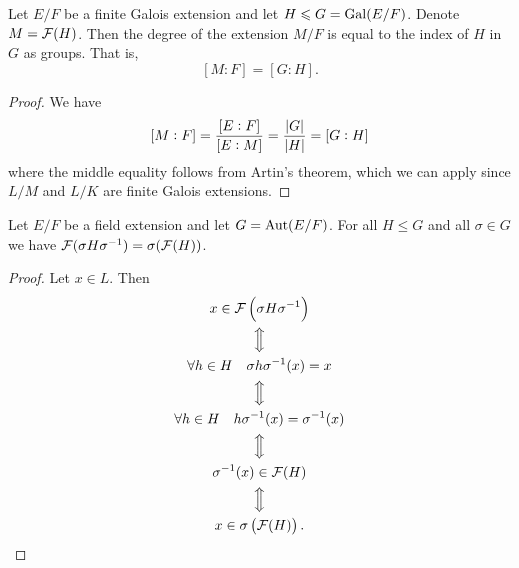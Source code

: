 \documentclass[11pt,a4paper]{article}
\begin{document}
\begin{corollary}
  Let $E/F$ be a finite Galois extension and
  let $H \leqslant G = \operatorname{Gal}(E/F)$.
  Denote $M = \mathcal F(H)$.
  Then the degree of the extension $M/F$ is equal to the index of $H$ in $G$
  as groups.
  That is,
  \[
    [M : F] = [G : H].
  \]
\end{corollary}
\begin{proof}
  We have
  \[
    [M : F] =
    \frac{[E : F]}{[E : M]} =
    \frac{\left\lvert G\right\rvert}{\left\lvert H\right\rvert} =
    [G : H]
  \]
  where the middle equality follows from Artin's theorem,
  which we can apply since $L/M$ and $L/K$
  are finite Galois extensions.
\end{proof}

\begin{lemma}
  \label{lem:lemma-for-galois-part-b}
  Let $E/F$ be a field extension and let $G = \operatorname{Aut}(E/F)$.
  For  all $H \leqslant G$ and all $\sigma \in G$ we have
  $\mathcal F(\sigma H \sigma^{-1}) = \sigma(\mathcal F(H))$.
\end{lemma}
\begin{proof}
  Let $x \in L$.
  Then
  \begin{gather*}
    x \in \FF\del{\sigma H \sigma^{-1}} \\
    \viff \\
    \forall h \in H \quad \sigma h \sigma^{-1}(x) = x \\
    \viff \\
    \forall h \in H \quad h \sigma^{-1} (x) = \sigma^{-1} (x) \\
    \viff \\
    \sigma^{-1}(x) \in \FF(H) \\
    \viff \\
    x \in \sigma\del{\FF(H)}.
  \end{gather*}
\end{proof}
\end{document}
